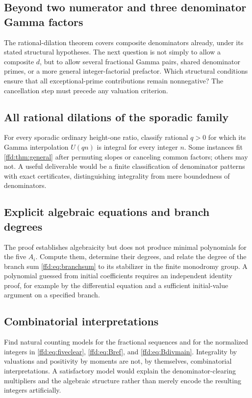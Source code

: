 \documentclass[11pt]{article}
\theoremstyle{definition}
\theoremstyle{remark}
\begin{document}
\subsection{Beyond two numerator and three denominator Gamma factors}
The rational-dilation theorem covers composite denominators already, under
its stated structural hypotheses. The next question is not simply to allow a
composite $d$, but to allow several fractional Gamma pairs, shared denominator
primes, or a more general integer-factorial prefactor. Which structural
conditions ensure that all exceptional-prime contributions remain
nonnegative? The cancellation step must precede any valuation criterion.

\subsection{All rational dilations of the sporadic family}
For every sporadic ordinary height-one ratio, classify rational $q>0$ for
which its Gamma interpolation $U(qn)$ is integral for every integer $n$.
Some instances fit \cref{ffd:thm:general} after permuting slopes or canceling
common factors; others may not. A useful deliverable would be a finite
classification of denominator patterns with exact certificates, distinguishing
integrality from mere boundedness of denominators.

\subsection{Explicit algebraic equations and branch degrees}
The proof establishes algebraicity but does not produce minimal polynomials
for the five $A_i$. Compute them, determine their degrees, and relate the
degree of the branch sum \eqref{ffd:eq:branchsum} to its stabilizer in the finite
monodromy group. A polynomial guessed from initial coefficients requires an
independent identity proof, for example by the differential equation and a
sufficient initial-value argument on a specified branch.

\subsection{Combinatorial interpretations}
Find natural counting models for the fractional sequences and for the
normalized integers in \eqref{ffd:eq:fiveclear}, \eqref{ffd:eq:Bref}, and
\eqref{ffd:eq:Bdivmain}. Integrality by valuations and positivity by moments are
not, by themselves, combinatorial interpretations. A satisfactory model
would explain the denominator-clearing multipliers and the algebraic
structure rather than merely encode the resulting integers artificially.
\end{document}
